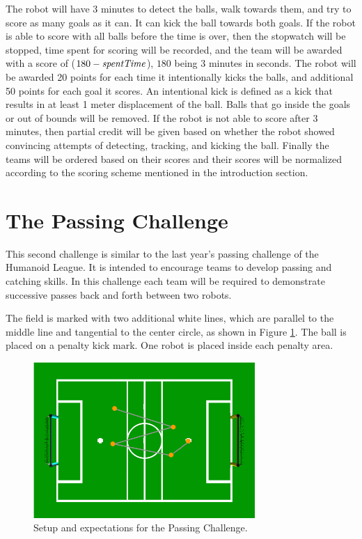 \documentclass{article}
\begin{document}
The robot will have 3 minutes to detect the balls, walk towards them, and try to score as many goals as it can. It can kick the ball towards both goals. If the robot is able to score with all balls before the time is over, then the stopwatch will be stopped, time spent for scoring will be recorded, and the team will be awarded with a score of ($180 - \emph{spentTime}$), $180$ being 3 minutes in seconds. The robot will be awarded 20 points for each time it intentionally kicks the balls, and additional 50 points for each goal it scores. An intentional kick is defined as a kick that results in at least 1 meter displacement of the ball. Balls that go inside the goals or out of bounds will be removed. If the robot is not able to score after 3 minutes, then partial credit will be given based on whether the robot showed convincing attempts of detecting, tracking, and kicking the ball. Finally the teams will be ordered based on their scores and their scores will be normalized according to the scoring scheme mentioned in the introduction section.

\section{The Passing Challenge}
\label{sec:passing}

This second challenge is similar to the last year's passing challenge of the Humanoid League. It is intended to encourage teams to develop passing and catching skills. In this challenge each team will be required to demonstrate successive passes back and forth between two robots.

The field is marked with two additional white lines, which are parallel to the middle line and tangential to the center circle, as shown in Figure \ref{fig:passingchallenge}. The ball is placed on a penalty kick mark.
One robot is placed inside each penalty area.

\begin{figure}[htbp]
 \centering
 \includegraphics[width=0.75\textwidth]{figures/nao_passingchallenge.png}
 \caption{Setup and expectations for the Passing Challenge.}
 \label{fig:passingchallenge}
\end{figure}
\end{document}
